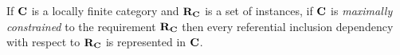 \documentclass[xcolor=pst,dvips]{beamer}
\begin{document}
\begin{frame}
\begin{lemma}
If $\textbf{C}$ is a locally finite category and $\textbf{R}_{\textbf{C}}$ is a set of instances, if $\textbf{C}$ is 
\textit{maximally constrained} to the requirement $\textbf{R}_{\textbf{C}}$ then
every referential inclusion dependency with respect to $\textbf{R}_{\textbf{C}}$ is represented in $\textbf{C}$.
\end{lemma}
\end{frame}
\end{document}
